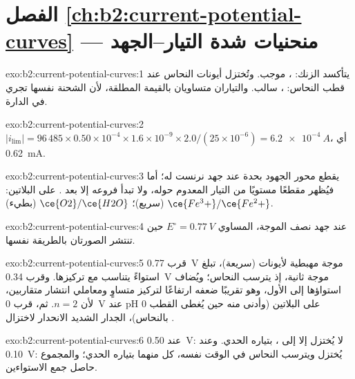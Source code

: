 \section*{الفصل \ref{ch:b2:current-potential-curves} --- منحنيات شدة التيار--الجهد}

\begin{solution}{exo:b2:current-potential-curves:1}
يتأكسد الزنك: ، موجب. وتُختزل أيونات النحاس عند قطب
النحاس: ، سالب. والتياران متساويان
بالقيمة المطلقة، لأن الشحنة نفسها تجري في الدارة.
\end{solution}

\begin{solution}{exo:b2:current-potential-curves:2}
$|i_{\lim}| = 96\,485 \times 0.50 \times 10^{-4} \times 1.6 \times 10^{-9} \times
2.0/(25 \times 10^{-6}) = \qty{6.2e-4}{A}$، أي \qty{0.62}{mA}.
\end{solution}

\begin{solution}{exo:b2:current-potential-curves:3}
 يقطع محور الجهود بحدة عند جهد نرنست له؛ أما  فيُظهر مقطعًا مستويًا من التيار المعدوم حوله، ولا تبدأ فروعه
إلا بعد . على البلاتين: $\ce{Fe^3+}/\ce{Fe^2+}$ (سريع)؛
$\ce{O2}/\ce{H2O}$ (بطيء).
\end{solution}

\begin{solution}{exo:b2:current-potential-curves:4}
عند جهد نصف الموجة، المساوي $E^\circ = \qty{0.77}{V}$ حين تنتشر الصورتان
بالطريقة نفسها.
\end{solution}

\begin{solution}{exo:b2:current-potential-curves:5}
قرب \qty{0.77}{V} موجة مهبطية لأيونات  (سريعة)، تبلغ استواءً
يتناسب مع تركيزها. وقرب \qty{0.34}{V} موجة ثانية، إذ يترسب
النحاس؛ ويُضاف استواؤها إلى الأول، وهو تقريبًا ضعفه ارتفاعًا لتركيز
متساوٍ ومعاملي انتشار متقاربين، لأن $n = 2$. ثم، قرب
\qty{0}{V} عند pH 0 على البلاتين (وأدنى منه حين يُغطى القطب بالنحاس)،
الجدار الشديد الانحدار لاختزال .
\end{solution}

\begin{solution}{exo:b2:current-potential-curves:6}
عند \qty{0.50}{V}: لا يُختزل إلا  إلى ، بتياره الحدي.
وعند \qty{0.10}{V}: يُختزل  ويترسب النحاس في الوقت نفسه،
كل منهما بتياره الحدي؛ والمجموع حاصل جمع الاستواءين.
\end{solution}

